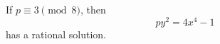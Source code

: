 \begin{proposition}
    If $p\equiv3\pmod8$, then
\[
    py^2=4x^4-1
\]
    has a rational solution.
\end{proposition}
